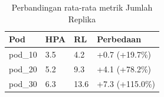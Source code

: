 \begin{table}[ht]
  \centering
  \caption{Perbandingan rata-rata metrik Jumlah Replika}\label{tab:deskriptif-replica}
  \begin{tabular}{llll}
    \toprule
    Pod & HPA & RL & Perbedaan \\
    \midrule
    pod\_10 & 3.5 & 4.2 & +0.7 (+19.7\%) \\
    pod\_20 & 5.2 & 9.3 & +4.1 (+78.2\%) \\
    pod\_30 & 6.3 & 13.6 & +7.3 (+115.0\%) \\
    \bottomrule
  \end{tabular}
\end{table}